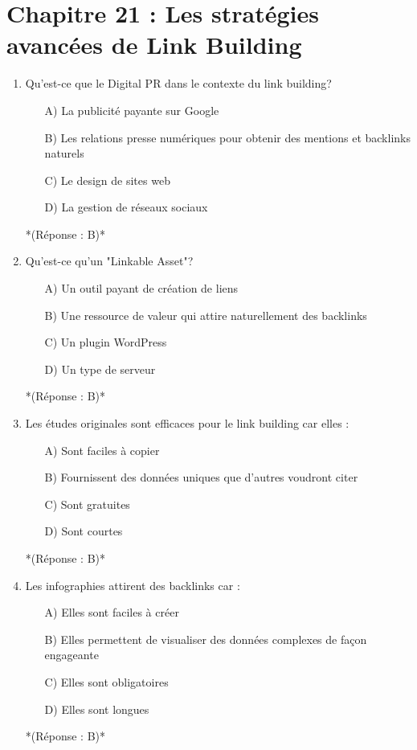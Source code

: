 \documentclass[12pt,a4paper,twoside]{report}
\begin{document}
\section*{Chapitre 21 : Les stratégies avancées de Link Building}

\begin{enumerate}
\item Qu'est-ce que le Digital PR dans le contexte du link building?
\begin{itemize}
\item[A)] La publicité payante sur Google
\item[B)] Les relations presse numériques pour obtenir des mentions et backlinks naturels
\item[C)] Le design de sites web
\item[D)] La gestion de réseaux sociaux
\end{itemize}
*(Réponse : B)*

\item Qu'est-ce qu'un "Linkable Asset"?
\begin{itemize}
\item[A)] Un outil payant de création de liens
\item[B)] Une ressource de valeur qui attire naturellement des backlinks
\item[C)] Un plugin WordPress
\item[D)] Un type de serveur
\end{itemize}
*(Réponse : B)*

\item Les études originales sont efficaces pour le link building car elles :
\begin{itemize}
\item[A)] Sont faciles à copier
\item[B)] Fournissent des données uniques que d'autres voudront citer
\item[C)] Sont gratuites
\item[D)] Sont courtes
\end{itemize}
*(Réponse : B)*

\item Les infographies attirent des backlinks car :
\begin{itemize}
\item[A)] Elles sont faciles à créer
\item[B)] Elles permettent de visualiser des données complexes de façon engageante
\item[C)] Elles sont obligatoires
\item[D)] Elles sont longues
\end{itemize}
*(Réponse : B)*


\end{enumerate}
\end{document}
